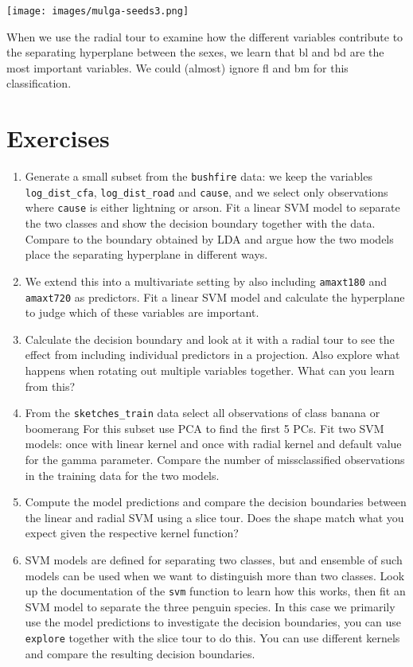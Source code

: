 \documentclass[
  letterpaper,
]{krantz}
\providecommand{\tightlist}{%
  \setlength{\itemsep}{0pt}\setlength{\parskip}{0pt}}\usepackage{longtable,booktabs,array}
\newcommand{\insightbox}[1]{%
\noindent\colorbox{insight!30}{%
\begin{minipage}{0.98\textwidth}%
    \centering%
    \begin{minipage}[c]{0.15\textwidth} %
      \texttt{[image: images/mulga-seeds3.png]} %
    \end{minipage}%
    \hfill %
    \begin{minipage}[c]{0.8\textwidth} %
      \bigskip%
      \textsf{#1}%
      \bigskip%
    \end{minipage}%
    \hspace*{3mm}%
  \end{minipage}%
}%
}
\begin{document}
\insightbox{When we use the radial tour to examine how the different variables contribute to the separating hyperplane between the sexes, we learn that {\textsf bl} and {\textsf bd} are the most important variables.  We could (almost) ignore {\textsf fl} and {\textsf bm} for this classification.}

\hypertarget{exercises-9}{%
\section*{Exercises}\label{exercises-9}}


\begin{enumerate}
\def\labelenumi{\arabic{enumi}.}
\tightlist
\item
  Generate a small subset from the \texttt{bushfire} data: we keep the
  variables \texttt{log\_dist\_cfa}, \texttt{log\_dist\_road} and
  \texttt{cause}, and we select only observations where \texttt{cause}
  is either lightning or arson. Fit a linear SVM model to separate the
  two classes and show the decision boundary together with the data.
  Compare to the boundary obtained by LDA and argue how the two models
  place the separating hyperplane in different ways.
\item
  We extend this into a multivariate setting by also including
  \texttt{amaxt180} and \texttt{amaxt720} as predictors. Fit a linear
  SVM model and calculate the hyperplane to judge which of these
  variables are important.
\item
  Calculate the decision boundary and look at it with a radial tour to
  see the effect from including individual predictors in a projection.
  Also explore what happens when rotating out multiple variables
  together. What can you learn from this?
\item
  From the \texttt{sketches\_train} data select all observations of
  class banana or boomerang For this subset use PCA to find the first 5
  PCs. Fit two SVM models: once with linear kernel and once with radial
  kernel and default value for the gamma parameter. Compare the number
  of missclassified observations in the training data for the two
  models.
\item
  Compute the model predictions and compare the decision boundaries
  between the linear and radial SVM using a slice tour. Does the shape
  match what you expect given the respective kernel function?
\item
  SVM models are defined for separating two classes, but and ensemble of
  such models can be used when we want to distinguish more than two
  classes. Look up the documentation of the \texttt{svm} function to
  learn how this works, then fit an SVM model to separate the three
  penguin species. In this case we primarily use the model predictions
  to investigate the decision boundaries, you can use \texttt{explore}
  together with the slice tour to do this. You can use different kernels
  and compare the resulting decision boundaries.
\end{enumerate}
\end{document}
